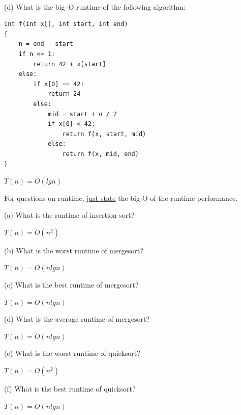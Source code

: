\mbox{}\\
(d)
What is the big--O runtime of the following algorithm:
\begin{Verbatim}[frame=single]
int f(int x[], int start, int end)
{
    n = end - start
    if n <= 1:
        return 42 + x[start]
    else:
        if x[0] == 42:
            return 24
        else:
            mid = start + n / 2
            if x[0] < 42:
                return f(x, start, mid)
            else:
                return f(x, mid, end) 
}
\end{Verbatim}
\ANSWER
\begin{answerlong}
$T(n) = O(lgn)$
\end{answerlong}


\newpage
\nextq %
For questions on runtime,
\underline{just state} the big-O of the runtime performance.

(a)
What is the runtime of insertion sort?
\\
\ANSWER
\begin{answerlong}
$T(n) = O(n^2)$
\end{answerlong}
  
(b)
What is the worst runtime of mergesort?
\\
\ANSWER
\begin{answerlong}
$T(n) = O(nlgn)$
\end{answerlong}

(c)
What is the best runtime of mergesort?
\\
\ANSWER
\begin{answerlong}
$T(n) = O(nlgn)$
\end{answerlong}
  
(d)
What is the average runtime of mergesort?
\\
\ANSWER
\begin{answerlong}
$T(n) = O(nlgn)$
\end{answerlong}
  
(e)
What is the worst runtime of quicksort?
\\
\ANSWER
\begin{answerlong}
$T(n) = O(n^2)$
\end{answerlong}
  
(f)
What is the best runtime of quicksort?
\\
\ANSWER
\begin{answerlong}
$T(n) = O(nlgn)$
\end{answerlong}
  
